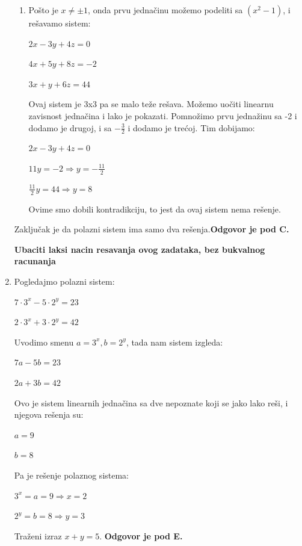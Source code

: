 \documentclass[a4paper,12pt]{report}
\begin{document}
\begin{enumerate}[1.]
\begin{enumerate}[1)]
\item Po\v{s}to je $x \neq \pm 1$, onda prvu jedna\v{c}inu mo\v{z}emo podeliti sa $(x^2 - 1)$, i re\v{s}avamo sistem:
\begin{center}
\par $2x -3y + 4z = 0$
\par $4x + 5y +8z = -2$
\par $3x + y + 6z = 44$
\end{center}
\par Ovaj sistem je 3x3 pa se malo te\v{z}e re\v{s}ava. Mo\v{z}emo uo\v{c}iti linearnu zavisnost jedna\v{c}ina i lako je pokazati. Pomno\v{z}imo prvu jedna\v{z}inu sa -2 i dodamo je drugoj, i sa $-\frac{3}{2}$ i dodamo je tre\'{c}oj. Tim dobijamo:
\begin{center}
\par $2x -3y + 4z = 0$
\par $11y = -2 \Longrightarrow y = -\frac{11}{2}$
\par $\frac{11}{2}y = 44 \Longrightarrow y = 8$
\end{center}
\par Ovime smo dobili kontradikciju, to jest da ovaj sistem nema re\v{s}enje.
\end{enumerate}
\par Zaklju\v{c}ak je da polazni sistem ima samo dva re\v{s}enja.\textbf{Odgovor je pod C.} 

\textbf{Ubaciti laksi nacin resavanja ovog zadataka, bez bukvalnog racunanja}

\item Pogledajmo polazni sistem:
\begin{center}
\par $7 \cdot 3^{x} - 5 \cdot 2^{y} = 23$
\par $2 \cdot 3^{x} + 3 \cdot 2^{y} = 42$
\end{center}
\par Uvodimo smenu $a = 3^x, b = 2^y$, tada nam sistem izgleda:
\begin{center}
\par $7 a - 5b = 23$
\par $2 a + 3 b = 42$
\end{center}
\par Ovo je sistem linearnih jedna\v{c}ina sa dve nepoznate koji se jako lako re\v{s}i, i njegova re\v{s}enja su:
\begin{center}
\par $a = 9$
\par $b = 8$
\end{center}
\par Pa je re\v{s}enje polaznog sistema:
\begin{center}
\par $3^x = a = 9\Longrightarrow x = 2$
\par $2^y = b = 8 \Longrightarrow y = 3$
\end{center}
\par Tra\v{z}eni izraz $x+y = 5$. \textbf{Odgovor je pod E.}


\end{enumerate}
\end{document}

